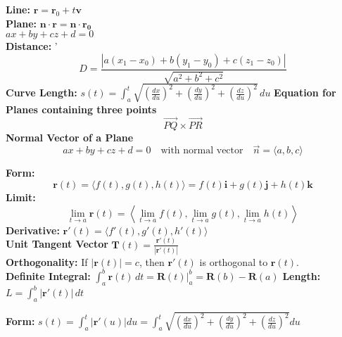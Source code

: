 \documentclass[2pt]{article}
\begin{document}
\begin{multicols}{2}
\begin{tcolorbox}[title=\textbf{Lines and Planes}, colframe=lightblue]
    \textbf{Line:} $\mathbf{r} = \mathbf{r}_0 + t \mathbf{v}$ \\
    \textbf{Plane:} $\mathbf{n} \cdot \mathbf{r} = \mathbf{n} \cdot \mathbf{r_0}$ \\
    $ax + by + cz + d = 0$ \\
    \textbf{Distance:}  '
    \[ D = \frac{|a(x_1 - x_0) + b(y_1 - y_0) + c(z_1 - z_0)|}{\sqrt{a^2 + b^2 + c^2}} \]
    \textbf{Curve Length:} $s(t) = \int_{a}^{t} \sqrt{\left(\frac{dx}{du}\right)^2 + \left(\frac{dy}{du}\right)^2 + \left(\frac{dz}{du}\right)^2} \, du$
    \textbf{Equation for Planes containing three points}
    \[ \vec{PQ} \times \vec{PR}\]
    \textbf{Normal Vector of a Plane} 
    \[ ax + by + cz + d = 0 \quad \text{with normal vector} \quad \vec{n} = \langle a, b, c \rangle \]

\end{tcolorbox}

\begin{tcolorbox}[title=\textbf{Vector Value Functions}, colframe=lightblue]
    \textbf{Form:} 	 
    \[ \mathbf{r}(t) = \langle f(t), g(t), h(t) \rangle = f(t) \mathbf{i} + g(t) \mathbf{j} + h(t) \mathbf{k} \] 
    \textbf{Limit:} 
    \[ \lim_{t \to a} \mathbf{r}(t) = \left\langle \lim_{t \to a} f(t), \lim_{t \to a} g(t), \lim_{t \to a} h(t) \right\rangle \] 
    \textbf{Derivative:} $\mathbf{r}'(t) = \langle f'(t), g'(t), h'(t) \rangle $ \\
    \textbf{Unit Tangent Vector} $\mathbf{T}(t) = \frac{\mathbf{r}'(t)}{|\mathbf{r}'(t)|}$ \\
    \textbf{Orthogonality:} If \(|\mathbf{r}(t)| = c\), then \(\mathbf{r}'(t)\) is orthogonal to \(\mathbf{r}(t)\). \\
    \textbf{Definite Integral:} $ \int_a^b \mathbf{r}(t) \, dt = \mathbf{R}(t) \Big|_a^b = \mathbf{R}(b) - \mathbf{R}(a) $
    \textbf{Length:} $ L = \int_a^b |\mathbf{r}'(t)| \, dt$
\end{tcolorbox}

\begin{tcolorbox}[title=\textbf{Curvature}, colframe=lightblue]
    \textbf{Form:} 	$ s(t) = \int_{a}^{t} |\mathbf{r}'(u)| du = \int_{a}^{t} \sqrt{\left(\frac{dx}{du}\right)^{2} + \left(\frac{dy}{du}\right)^{2} + \left(\frac{dz}{du}\right)^{2}} du $ 
\end{tcolorbox}


\end{multicols}
\end{document}
